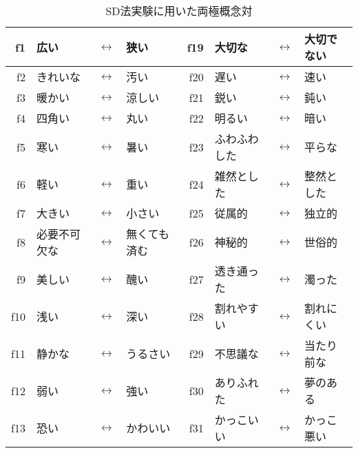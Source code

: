 \begin{table}[tb] 
\caption{SD法実験に用いた両極概念対}
\label{tbl:hyo3}
\begin{center}
\begin{small}
\begin{tabular}{|rlcl|rlcl|}
 \hline
 f1 &   広い          & $\longleftrightarrow$  &  狭い          & f19  & 大切な        &$\longleftrightarrow$  & 大切でない                 \\\hline
 f2 &   きれいな      & $\longleftrightarrow$  &  汚い          & f20  & 遅い          &$\longleftrightarrow$  & 速い             \\\hline
 f3 &   暖かい        & $\longleftrightarrow$  &  涼しい        & f21  & 鋭い          &$\longleftrightarrow$  & 鈍い             \\\hline
 f4 &   四角い        & $\longleftrightarrow$  &  丸い          & f22  & 明るい        &$\longleftrightarrow$  & 暗い             \\\hline
 f5 &   寒い          & $\longleftrightarrow$  &  暑い          & f23  & ふわふわした  &$\longleftrightarrow$  & 平らな           \\\hline
 f6 &   軽い          & $\longleftrightarrow$  &  重い          & f24  & 雑然とした    &$\longleftrightarrow$  & 整然とした       \\\hline
 f7 &   大きい        & $\longleftrightarrow$  &  小さい        & f25  & 従属的        &$\longleftrightarrow$  & 独立的           \\\hline
 f8 &   必要不可欠な  & $\longleftrightarrow$  &  無くても済む  & f26  & 神秘的        &$\longleftrightarrow$  & 世俗的           \\\hline
 f9 &   美しい        & $\longleftrightarrow$  &  醜い          & f27  & 透き通った    &$\longleftrightarrow$  & 濁った           \\\hline
f10 &   浅い          & $\longleftrightarrow$  &  深い          & f28  & 割れやすい    &$\longleftrightarrow$  & 割れにくい       \\\hline
f11 &   静かな        & $\longleftrightarrow$  &  うるさい      & f29  & 不思議な      &$\longleftrightarrow$  & 当たり前な       \\\hline
f12 &   弱い          & $\longleftrightarrow$  &  強い          & f30  & ありふれた    &$\longleftrightarrow$  & 夢のある         \\\hline
f13 &   恐い          & $\longleftrightarrow$  &  かわいい      & f31  & かっこいい    &$\longleftrightarrow$  & かっこ悪い       \\\hline

\end{tabular}
\end{small}
\end{center}
\end{table}
